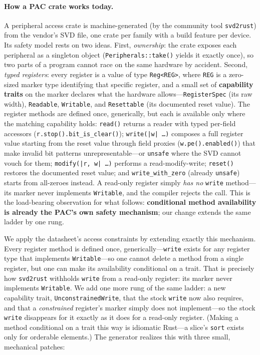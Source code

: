 \paragraph{How a PAC crate works today.}
A peripheral access crate is machine-generated (by the community tool
\texttt{svd2rust}) from the vendor's SVD file, one crate per family with a
build feature per device. Its safety model rests on two ideas. First,
\emph{ownership}: the crate exposes each peripheral as a singleton object
(\texttt{Peripherals::take()} yields it exactly once), so two parts of a
program cannot race on the same hardware by accident. Second, \emph{typed
registers}: every register is a value of type \texttt{Reg<REG>}, where
\texttt{REG} is a zero-sized marker type identifying that specific register,
and a small set of \textbf{capability traits} on the marker declares what the
hardware allows---\texttt{RegisterSpec} (its raw width), \texttt{Readable},
\texttt{Writable}, and \texttt{Resettable} (its documented reset value). The
register methods are defined once, generically, but each is available only
where the matching capability holds: \texttt{read()} returns a reader with
typed per-field accessors (\texttt{r.stop().bit\_is\_clear()});
\texttt{write(|w| \ldots)} composes a full register value starting from the
reset value through field proxies (\texttt{w.pe().enabled()}) that make
invalid bit patterns unrepresentable---or \texttt{unsafe} where the SVD
cannot vouch for them; \texttt{modify(|r, w| \ldots)} performs a
read-modify-write; \texttt{reset()} restores the documented reset value; and
\texttt{write\_with\_zero} (already \texttt{unsafe}) starts from all-zeroes
instead. A read-only register simply \emph{has no} \texttt{write} method---%
its marker never implements \texttt{Writable}, and the compiler rejects the
call. This is the load-bearing observation for what follows:
\textbf{conditional method availability is already the PAC's own safety
mechanism}; our change extends the same ladder by one rung.

We apply the datasheet's access constraints by extending exactly this
mechanism. Every register method is defined once, generically---\texttt{write}
exists for any register type that implements \texttt{Writable}---so one cannot
delete a method from a single register, but one can make its availability
conditional on a trait. That is precisely how \texttt{svd2rust} withholds
\texttt{write} from a read-only register: its marker never implements
\texttt{Writable}. We add one more rung of the same ladder: a new capability
trait, \texttt{UnconstrainedWrite}, that the stock \texttt{write} now also
requires, and that a \emph{constrained} register's marker simply does not
implement---so the stock \texttt{write} disappears for it exactly as it does
for a read-only register. (Making a method conditional on a trait this way is
idiomatic Rust---a slice's \texttt{sort} exists only for orderable elements.)
The generator realizes this with three small, mechanical patches:


